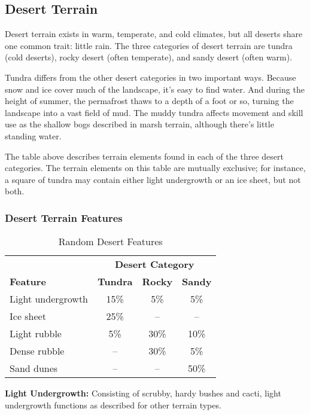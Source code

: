 \subsection{Desert Terrain}

Desert terrain exists in warm, temperate, and cold climates, but all deserts share 
one common trait: little rain. The three categories of desert terrain are tundra 
(cold deserts), rocky desert (often temperate), and sandy desert (often warm).

Tundra differs from the other desert categories in two important ways. Because 
snow and ice cover much of the landscape, it's easy to find water. And during the 
height of summer, the permafrost thaws to a depth of a foot or so, turning the 
landscape into a vast field of mud. The muddy tundra affects movement and skill 
use as the shallow bogs described in marsh terrain, although there's little standing 
water.

The table above describes terrain elements found in each of the three desert categories. 
The terrain elements on this table are mutually exclusive; for instance, a square 
of tundra may contain either light undergrowth or an ice sheet, but not both.

\subsubsection{Desert Terrain Features}

\begin{table}[htb]
\caption{Random Desert Features}
\centering
\begin{tabular}{l c c c}
 & \multicolumn{3}{c}{\textbf{Desert Category}}\\
\textbf{Feature} & \textbf{Tundra} & \textbf{Rocky} & \textbf{Sandy}\\
Light undergrowth & 15\% & 5\% & 5\%\\
Ice sheet & 25\% & -- & --\\
Light rubble & 5\% & 30\% & 10\%\\
Dense rubble & -- & 30\% & 5\%\\
Sand dunes & -- & -- & 50\%\\
\end{tabular}
\end{table}

\textbf{Light Undergrowth:} Consisting of scrubby, hardy bushes and cacti, light 
undergrowth functions as described for other terrain types.

